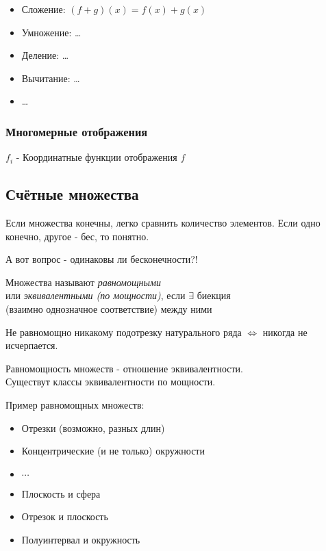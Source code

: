 \documentclass[12pt, a4paper]{article}
\begin{document}
    \begin{itemize}
      \item Сложение: $(f + g)(x) = f(x) + g(x)$
      \item Умножение: \ldots
      \item Деление: \ldots
      \item Вычитание: \ldots
      \item \ldots
    \end{itemize}

    \subsubsection{Многомерные отображения}
    
    $f_i$ - Координатные функции отображения $f$


    \subsection{Счётные множества}

    Если множества конечны, легко сравнить количество элементов.
    Если одно конечно, другое - бес, то понятно.

    А вот вопрос - одинаковы ли бесконечности?!



    \begin{definition}
      Множества называют \textit{равномощными} \\
      или \textit{эквивалентными (по мощности)}, если $\exists$ биекция \\
      (взаимно однозначное соответствие) между ними
    \end{definition}

    \begin{definition}
      Не равномощно никакому подотрезку натурального ряда 
      $\Longleftrightarrow$ никогда не исчерпается.
    \end{definition}

    \begin{note}
      Равномощность множеств - отношение эквивалентности. \\
      Существут классы эквивалентности по мощности.
    \end{note}

    \begin{example}
      Пример равномощных множеств:
      \begin{itemize}
        \item Отрезки (возможно, разных длин)
        \item Концентрические (и не только) окружности
        \item $\cdots$
        \item Плоскость и сфера
        \item Отрезок и плоскость
        \item Полуинтервал и окружность
      \end{itemize}
    \end{example}
    
\end{document}
